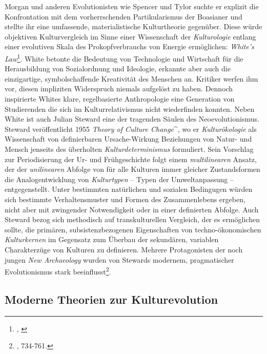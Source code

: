 \documentclass[openany,twoside,twocolumn]{book}
\let\rmarkdownfootnote\footnote%
\def\footnote{\protect\rmarkdownfootnote}
\begin{document}
Morgan und anderen Evolutionisten wie Spencer und Tylor suchte er
explizit die Konfrontation mit dem vorherrschenden Partikularismus der
Boasianer und stellte ihr eine umfassende, materialistische
Kulturtheorie gegenüber. Diese würde objektiven Kulturvergleich im Sinne
einer Wissenschaft der \emph{Kulturologie} entlang einer evolutiven
Skala des Prokopfverbrauchs von Energie ermöglichen: \emph{White's
Law}\footnote{\textcite{white_energy_1943},
  \textcite{white_science_1949}}. White betonte die Bedeutung von
Technologie und Wirtschaft für die Herausbildung von Sozialordnung und
Ideologie, erkannte aber auch die einzigartige, symbolschaffende
Kreativität des Menschen an. Kritiker werfen ihm vor, diesen impliziten
Widerspruch niemals aufgelöst zu haben. Dennoch inspirierte Whites
klare, regelbasierte Anthropologie eine Generation von Studierenden die
sich im Kulturrelativismus nicht wiederfinden konnten. Neben White ist
auch Julian Steward eine der tragenden Säulen des Neoevolutionismus.
Steward veröffentlicht 1955 \emph{Theory of Culture Change}\^{}, wo er
\emph{Kulturökologie} als Wissenschaft von definierbaren Ursache-Wirkung
Beziehungen von Natur- und Mensch jenseits des überholten
\emph{Kulturdeterminismus} formuliert. Sein Vorschlag zur Periodisierung
der Ur- und Frühgeschichte folgt einem \emph{multilinearen} Ansatz, der
der \emph{unilinearen} Abfolge von für alle Kulturen immer gleicher
Zustandsformen die Analogentwicklung von \emph{Kulturtypen} -- Typen der
Umweltanpassung -- entgegenstellt. Unter bestimmten natürlichen und
sozialen Bedingugen würden sich bestimmte Verhaltensmuster und Formen
des Zusammenlebens ergeben, nicht aber mit zwingender Notwendigkeit oder
in einer definierten Abfolge. Auch Steward bezog sich methodisch auf
transkulturellen Vergleich, der es ermöglichen sollte, die primären,
subsistenzbezogenen Eigenschaften von techno-ökonomischen
\emph{Kulturkernen} im Gegensatz zum Überbau der sekundären, variablen
Charakterzüge von Kulturen zu definieren. Mehrere Protagonisten der noch
jungen \emph{New Archaeology} wurden von Stewards modernem,
pragmatischer Evolutionismus stark beeinflusst\footnote{\textcite{petermann_geschichte_2004},
  734-761.}.

\hypertarget{moderne-theorien-zur-kulturevolution}{%
\subsection{Moderne Theorien zur
Kulturevolution}\label{moderne-theorien-zur-kulturevolution}}
\end{document}
